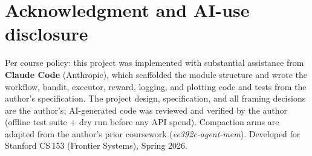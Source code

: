 \documentclass[conference]{IEEEtran}
\begin{document}
\section*{Acknowledgment and AI-use disclosure}
Per course policy: this project was implemented with substantial assistance from
\textbf{Claude Code} (Anthropic), which scaffolded the module structure and wrote the
workflow, bandit, executor, reward, logging, and plotting code and tests from the
author's specification. The project design, specification, and all framing decisions
are the author's; AI-generated code was reviewed and verified by the author (offline
test suite $+$ dry run before any API spend). Compaction arms are adapted from the
author's prior coursework (\textit{ee392c-agent-mem}). Developed for Stanford CS\,153
(Frontier Systems), Spring 2026.



\end{document}
